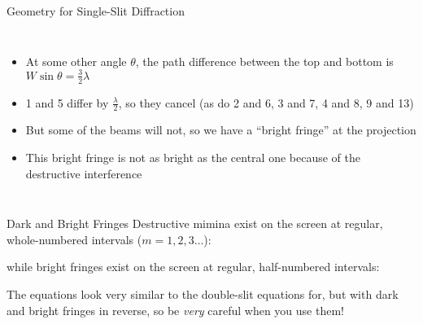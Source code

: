\documentclass[12pt,compress,aspectratio=169]{beamer}
\newcommand{\eq}[2]{\vspace{#1}{\LARGE\begin{displaymath}#2\end{displaymath}}}
\begin{document}
\begin{frame}{Geometry for Single-Slit Diffraction}
  \begin{columns}

    \begin{itemize}
    \item At some other angle $\theta$, the path difference between the top
      and bottom is $\displaystyle W\sin\theta=\frac32\lambda$
    \item 1 and 5 differ by $\displaystyle\frac{\lambda}{2}$, so they cancel
      (as do 2 and 6, 3 and 7, 4 and 8, 9 and 13)
    \item But some of the beams will not, so we have a ``bright fringe'' at the 
      projection
    \item This bright fringe is not as bright as the central one because
      of the destructive interference
    \end{itemize}
  \end{columns}
\end{frame}



\begin{frame}{Dark and Bright Fringes}
  Destructive mimina exist on the screen at regular, whole-numbered intervals
  ($m=1,2,3\ldots$):

  \eq{-.2in}{
    \boxed{m\lambda=W\sin\theta_m}
  }

  while bright fringes exist on the screen at regular, half-numbered intervals:

  \eq{-.2in}{
    \boxed{\left(m+\frac12\right)\lambda=W\sin\theta_m}
  }

  The equations look very similar to the double-slit equations for, but with
  dark and bright fringes in reverse, so be \emph{very} careful when you use
  them!
\end{frame}
\end{document}
